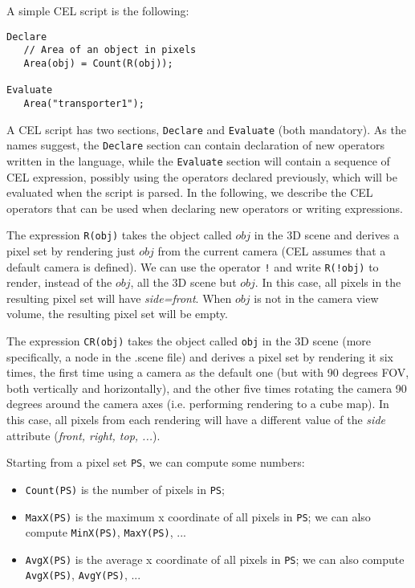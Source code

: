 A simple CEL script is the following:

\begin{verbatim}
Declare
   // Area of an object in pixels
   Area(obj) = Count(R(obj));

Evaluate
   Area("transporter1");
\end{verbatim}

A CEL script has two sections, \texttt{Declare} and \texttt{Evaluate} (both mandatory). As the names suggest, the \texttt{Declare} section can contain declaration of new operators written in the language, while the \texttt{Evaluate} section will contain a sequence of CEL expression, possibly using the operators declared previously, which will be evaluated when the script is parsed. In the following, we describe the CEL operators that can be used when declaring new operators or writing expressions. 

The expression \texttt{R(obj)} takes the object called $obj$ in the 3D scene and derives a pixel set by rendering just $obj$ from the current camera (CEL assumes that a default camera is defined). We can use the operator \texttt{!} and write \texttt{R(!obj)} to render, instead of the $obj$, all the 3D scene but $obj$. In this case, all pixels in the resulting pixel set will have \emph{side=front}. When $obj$ is not in the camera view volume, the resulting pixel set will be empty.

The expression \texttt{CR(obj)} takes the object called \texttt{obj} in the 3D scene (more specifically, a node in the .scene file) and derives a pixel set by rendering it six times, the first time using a camera as the default one (but with 90 degrees FOV, both vertically and horizontally), and the other five times rotating the camera 90 degrees around the camera axes (i.e. performing rendering to a cube map). In this case, all pixels from each rendering will have a different value of the \emph{side} attribute (\emph{front, right, top, ...}).


Starting from a pixel set \texttt{PS}, we can compute some numbers:
\begin{itemize}
	\setlength{\itemsep}{2pt}
	\setlength{\parskip}{0pt}
	\setlength{\parsep}{0pt}
	
	\item \texttt{Count(PS)} is the number of pixels in \texttt{PS}; 
	\item \texttt{MaxX(PS)} is the maximum x coordinate of all pixels in \texttt{PS}; we can also compute \texttt{MinX(PS)}, \texttt{MaxY(PS)}, ...
	\item \texttt{AvgX(PS)} is the average x coordinate of all pixels in \texttt{PS}; we can also compute \texttt{AvgX(PS)}, \texttt{AvgY(PS)}, ...
\end{itemize}

